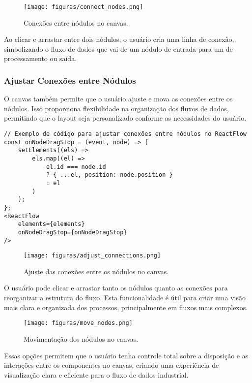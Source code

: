 \begin{figure}[htbp]
    \centering
    \texttt{[image: figuras/connect\_nodes.png]}
    \caption{Conexões entre nódulos no canvas.}
    \label{Fig:ConnectNodes}
\end{figure}

Ao clicar e arrastar entre dois nódulos, o usuário cria uma linha de conexão, simbolizando o fluxo de dados que vai de um nódulo de entrada para um de processamento ou saída.

\subsubsection{Ajustar Conexões entre Nódulos}

O canvas também permite que o usuário ajuste e mova as conexões entre os nódulos. Isso proporciona flexibilidade na organização dos fluxos de dados, permitindo que o layout seja personalizado conforme as necessidades do usuário.

\begin{verbatim}
// Exemplo de código para ajustar conexões entre nódulos no ReactFlow
const onNodeDragStop = (event, node) => {
    setElements((els) => 
        els.map((el) => 
            el.id === node.id 
            ? { ...el, position: node.position } 
            : el
        )
    );
};
<ReactFlow
    elements={elements}
    onNodeDragStop={onNodeDragStop}
/>
\end{verbatim}

\begin{figure}[htbp]
    \centering
    \texttt{[image: figuras/adjust\_connections.png]}
    \caption{Ajuste das conexões entre os nódulos no canvas.}
    \label{Fig:AdjustConnections}
\end{figure}

O usuário pode clicar e arrastar tanto os nódulos quanto as conexões para reorganizar a estrutura do fluxo. Esta funcionalidade é útil para criar uma visão mais clara e organizada dos processos, principalmente em fluxos mais complexos.

\begin{figure}[htbp]
    \centering
    \texttt{[image: figuras/move\_nodes.png]}
    \caption{Movimentação dos nódulos no canvas.}
    \label{Fig:MoveNodes}
\end{figure}

Essas opções permitem que o usuário tenha controle total sobre a disposição e as interações entre os componentes no canvas, criando uma experiência de visualização clara e eficiente para o fluxo de dados industrial.

